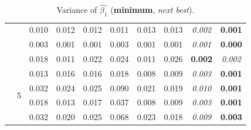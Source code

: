 \documentclass[authoryear, review, 11pt]{elsarticle}
\begin{document}
\begin{table}
\begin{center}
{\begin{tabular}{cccccccccc}
   &  & 0.010 & 0.012 & 0.012 & 0.011 & 0.013 & 0.013 & \emph{0.002} & \textbf{0.001} \\ 
   &  & 0.003 & 0.001 & 0.001 & 0.003 & 0.001 & 0.001 & \emph{0.001} & \textbf{0.000} \\ 
   &  & 0.018 & 0.011 & 0.022 & 0.024 & 0.011 & 0.026 & \textbf{0.002} & \emph{0.002} \\ 
  \cline{3-10}
   & \multirow{4}{*}{5} & 0.013 & 0.016 & 0.016 & 0.018 & 0.008 & 0.009 & \emph{0.003} & \textbf{0.001} \\ 
   &  & 0.032 & 0.024 & 0.025 & 0.090 & 0.021 & 0.019 & \emph{0.010} & \textbf{0.001} \\ 
   &  & 0.018 & 0.013 & 0.017 & 0.037 & 0.008 & 0.009 & \emph{0.003} & \textbf{0.001} \\ 
   &  & 0.032 & 0.020 & 0.025 & 0.068 & 0.023 & 0.018 & \emph{0.009} & \textbf{0.003} \\ 
  \end{tabular}}
\caption{Variance of $\hat{\beta_1}$ (\textbf{minimum}, \emph{next best}).\label{table:X1-var}}
\end{center}
\end{table}
\end{document}
